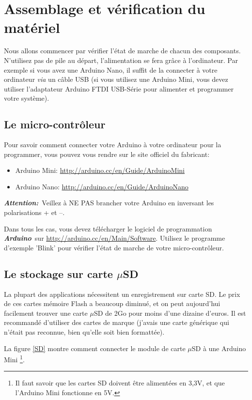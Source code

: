 \documentclass[twocolumn, 8pt]{article}
\newcommand\Ard{\textbf{\emph{Arduino}}~}
\newcommand\Att{\textbf{\emph{Attention:}}~}
\begin{document}
\section{Assemblage et vérification du matériel}

\par Nous allons commencer par vérifier l'état de marche de chacun des composants. N'utilisez pas de pile au départ, l'alimentation se fera grâce à l'ordinateur. Par exemple si vous avez une Arduino Nano, il suffit de la connecter à votre ordinateur \textit{via} un câble USB (si vous utilisez une Arduino Mini, vous devez utiliser l'adaptateur Arduino FTDI USB-Série pour alimenter et programmer votre système).


\subsection{Le micro-contrôleur}
\par Pour savoir comment connecter votre Arduino à votre ordinateur pour la programmer, vous pouvez vous rendre sur le site officiel du fabricant: 
\begin{itemize}
	\item Arduino Mini: \url{http://arduino.cc/en/Guide/ArduinoMini}
	\item Arduino Nano: \url{http://arduino.cc/en/Guide/ArduinoNano}
\end{itemize}

\par \Att Veillez à NE PAS brancher votre Arduino en inversant les polarisations + et --.
\par Dans tous les cas, vous devez télécharger le logiciel de programmation \Ard sur \url{http://arduino.cc/en/Main/Software}. Utilisez le programme d'exemple \textsf{'Blink'} pour vérifier l'état de marche de votre micro-contrôleur.


\subsection{Le stockage sur carte $\mu$SD}
\par La plupart des applications nécessitent un enregistrement sur carte SD. Le prix de ces cartes mémoire Flash a beaucoup diminué, et on peut aujourd'hui facilement trouver une carte $\mu$SD de 2Go pour moins d'une dizaine d'euros. Il est recommandé d'utiliser des cartes de marque (j'avais une carte générique qui n'était pas reconnue, bien qu'elle soit bien formattée).

\par La figure \ref{SD} montre comment connecter le module de carte $\mu$SD à une Arduino Mini \footnote{Il faut savoir que les cartes SD doivent être alimentées en 3,3V, et que l'Arduino Mini fonctionne en 5V.}.
\end{document}
